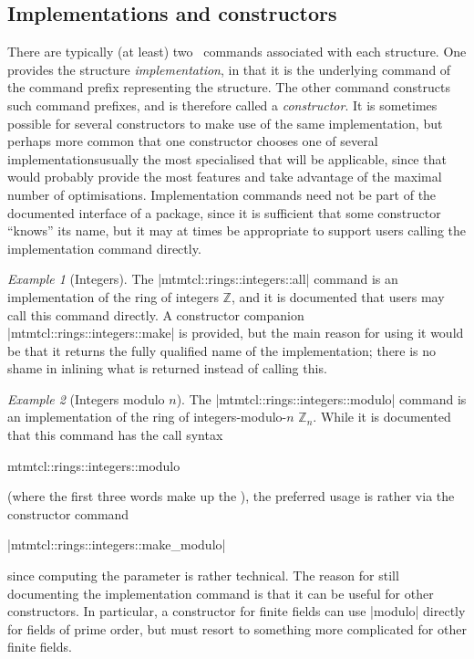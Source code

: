 \documentclass{mtmtcl}
\theoremstyle{plain}
\theoremstyle{remark}
\newtheorem*{example}{Example}
\begin{document}
\subsection{Implementations and constructors}

There are typically (at least) two \Tcl\ commands associated with each 
structure. One provides the structure \emph{implementation}, in that 
it is the underlying command of the command prefix representing the 
structure. The other command constructs such command prefixes, and is 
therefore called a \emph{constructor}. It is sometimes possible for 
several constructors to make use of the same implementation, but 
perhaps more common that one constructor chooses one of several 
implementations\Dash usually the most specialised that will be 
applicable, since that would probably provide the most features and 
take advantage of the maximal number of optimisations.
Implementation commands need not be part of the documented interface 
of a package, since it is sufficient that some constructor ``knows'' 
its name, but it may at times be appropriate to support users calling 
the implementation command directly.

\begin{example}[Integers]
  The |mtmtcl::rings::integers::all| command is an implementation of 
  the ring of integers $\mathbb{Z}$, and it is documented that users 
  may call this command directly. A constructor companion 
  |mtmtcl::rings::integers::make| is provided, but the main 
  reason for using it would be that it returns the fully qualified 
  name of the implementation; there is no shame in inlining what is 
  returned instead of calling this.
\end{example}

\begin{example}[Integers modulo $n$]
  The |mtmtcl::rings::integers::modulo| command is an implementation 
  of the ring of integers-modulo-$n$ $\mathbb{Z}_n$. While it is 
  documented that this command has the call syntax
  \begin{displaysyntax}
    mtmtcl::rings::integers::modulo   
     \regstar
  \end{displaysyntax}
  (where the first three words make up the ), the 
  preferred usage is rather via the constructor command
  \begin{displaysyntax}
    |mtmtcl::rings::integers::make_modulo| 
  \end{displaysyntax}
  since computing the  parameter is rather technical. The 
  reason for still documenting the implementation command is that it 
  can be useful for other constructors. In particular, a constructor 
  for finite fields can use |modulo| directly for fields of prime 
  order, but must resort to something more complicated for other 
  finite fields.
\end{example}
\end{document}
